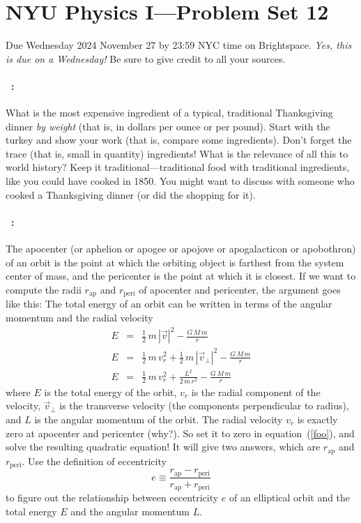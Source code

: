 \documentclass[12pt]{article}
\newcommand{\ap}{\mathrm{ap}}
\newcommand{\peri}{\mathrm{peri}}
\begin{document}
\section*{NYU Physics I---Problem Set 12}

Due Wednesday 2024 November 27 by 23:59 NYC time on Brightspace.
\emph{Yes, this is due on a Wednesday!} Be sure to give credit to
all your sources.

\paragraph{\problemname~\theproblem:}%
What is the most expensive ingredient of a typical, traditional
Thanksgiving dinner \emph{by weight} (that is, in dollars per ounce or
per pound).  Start with the turkey and show your work (that is,
compare some ingredients). Don't forget the trace (that is, small
in quantity) ingredients!
What is the relevance of all this to world
history? Keep it traditional---traditional food with traditional
ingredients, like you could have cooked in 1850.
You might want to discuss with someone who cooked
a Thanksgiving dinner (or did the shopping for it).

\paragraph{\problemname~\theproblem:}%
The apocenter (or aphelion or apogee or apojove or apogalacticon or apobothron)
of an orbit is the point at which the orbiting object is farthest from
the system center of mass, and the pericenter is the point at which it is closest.
If we want to compute the radii $r_\ap$ and $r_\peri$ of apocenter and pericenter, the argument
goes like this: The total energy of an orbit can be written in terms of the
angular momentum and the radial velocity
\begin{eqnarray}
E & = & \frac{1}{2}\,m\,|\vec{v}|^2 - \frac{G\,M\,m}{r}
\\
E & = & \frac{1}{2}\,m\,v_r^2 + \frac{1}{2}\,m\,|\vec{v}_\perp|^2 - \frac{G\,M\,m}{r}
\\
E & = & \frac{1}{2}\,m\,v_r^2 + \frac{L^2}{2\,m\,r^2} - \frac{G\,M\,m}{r}
\label{foo}
\end{eqnarray}
where $E$ is the total energy of the orbit, $v_r$ is the radial component of the velocity,
$\vec{v}_\perp$ is the transverse velocity (the components perpendicular to radius),
and $L$ is the angular momentum of the orbit.
The radial velocity $v_r$ is exactly zero at apocenter and pericenter (why?).
So set it to zero in equation~(\ref{foo}),
and solve the resulting quadratic equation! It will give two answers,
which are $r_\ap$ and $r_\peri$.
Use the definition of eccentricity
\begin{equation}
e \equiv \frac{r_\ap - r_\peri}{r_\ap + r_\peri}
\end{equation}
to figure out
the relationship between eccentricity $e$ of an elliptical orbit and
the total energy $E$ and the angular momentum $L$.
\end{document}
